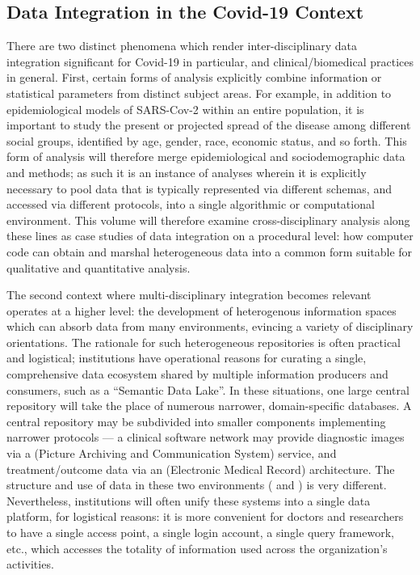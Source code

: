 \documentclass{statsoc}
\newcommand{\p}[1]{

\vspace{.75em}#1}
\newcommand{\textscc}[1]{{\color{orr!35!black}{{%
						\fontfamily{Cabin-TLF}\fontseries{b}\selectfont{\textsc{\scriptsize{#1}}}}}}}
\newcommand{\AcronymText}[1]{{\textscc{#1}}}
\newcommand{\q}[1]{{\fontfamily{qcr}\selectfont ``}#1{\fontfamily{qcr}\selectfont ''}}
\newcommand{\PACS}{\resizebox{!}{7pt}{\AcronymText{PACS}}}
\newcommand{\EMR}{\resizebox{!}{7pt}{\AcronymText{EMR}}}
\begin{document}
{\subsection{Data Integration in the Covid-19 Context}
\p{There are two distinct phenomena which render 
inter-disciplinary data integration significant for 
Covid-19 in particular, and clinical/biomedical practices 
in general.  First, certain forms of analysis explicitly 
combine information or statistical parameters from 
distinct subject areas.  For example, in addition 
to epidemiological models of SARS-Cov-2 within an 
entire population, it is important to study the 
present or projected spread of the disease among 
different social groups, identified by age, gender, 
race, economic status, and so forth.  This form 
of analysis will therefore merge epidemiological 
and sociodemographic data and methods; as such it is an 
instance of analyses wherein it is explicitly necessary 
to pool data that is typically represented 
via different schemas, and accessed via different 
protocols, into a single algorithmic or computational 
environment.  This volume will therefore 
examine cross-disciplinary analysis along these 
lines as case studies of data integration on a procedural 
level: how computer code can obtain and marshal heterogeneous 
data into a common form suitable for qualitative and quantitative analysis.} 
   
\p{The second context where multi-disciplinary integration 
becomes relevant operates at a higher level: the development 
of heterogenous information spaces which can absorb 
data from many environments, evincing a variety of 
disciplinary orientations.  The rationale for such heterogeneous 
repositories is often practical and logistical; institutions 
have operational reasons for curating a single, comprehensive data ecosystem shared 
by multiple information producers and consumers, such as 
a \q{Semantic Data Lake}.  In these situations, one 
large central repository will take the place of numerous 
narrower, domain-specific databases.  A central repository 
may be subdivided into smaller components implementing 
narrower protocols --- a clinical software network may provide 
diagnostic images via a \PACS{} (Picture Archiving and Communication 
System) service, and treatment/outcome data via an 
\EMR{} (Electronic Medical Record) architecture.  The 
structure and use of data in these two environments 
(\PACS{} and \EMR{}) is very different.  Nevertheless, 
institutions will often unify these systems into 
a single data platform, for logistical reasons: it 
is more convenient for doctors and researchers to 
have a single access point, a single login account, 
a single query framework, etc., which accesses the 
totality of information used across the organization's 
activities.}

}
\end{document}
